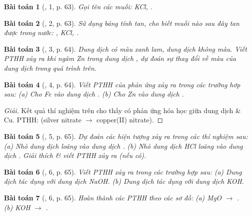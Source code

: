 \documentclass{article}
\newtheorem{baitoan}{Bài toán}
\begin{document}
\begin{baitoan}[\cite{SGK_KHTN_8_Canh_Dieu}, 1, p. 63]
	Gọi tên các muối: \emph{KCl, }.
\end{baitoan}

\begin{baitoan}[\cite{SGK_KHTN_8_Canh_Dieu}, 2, p. 63]
	Sử dụng bảng tính tan, cho biết muối nào sau đây tan được trong nước: \emph{, KCl, }.
\end{baitoan}

\begin{baitoan}[\cite{SGK_KHTN_8_Canh_Dieu}, 3, p. 64]
	Dung dịch \emph{} có màu xanh lam, dung dịch \emph{} không màu. Viết PTHH xảy ra khi ngâm \emph{Zn} trong dung dịch \emph{}, dự đoán sự thay đổi về màu của dung dịch trong quá trình trên.
\end{baitoan}

\begin{baitoan}[\cite{SGK_KHTN_8_Canh_Dieu}, 4, p. 64]
	Viết PTHH của phản ứng xảy ra trong các trường hơp sau: (a) Cho \emph{Fe} vào dung dịch \emph{}. (b) Cho \emph{Zn} vào dung dịch \emph{}.
\end{baitoan}

\begin{proof}[Giải]
	Kết quả thí nghiệm trên cho thấy có phản ứng hóa học giữa dung dịch  \& Cu. PTHH:  (silver nitrate $\to$ copper(II) nitrate).
\end{proof}

\begin{baitoan}[\cite{SGK_KHTN_8_Canh_Dieu}, 5, p. 65]
	Dự đoán các hiện tượng xảy ra trong các thí nghiệm sau: (a) Nhỏ dung dịch \emph{} loãng vào dung dịch \emph{}. (b) Nhỏ dung dịch \emph{HCl} loãng vào dung dịch \emph{}. Giải thích \& viết PTHH xảy ra (nếu có).
\end{baitoan}

\begin{baitoan}[\cite{SGK_KHTN_8_Canh_Dieu}, 6, p. 65]
	Viết PTHH xảy ra trong các trường hợp sau: (a) Dung dịch \emph{} tác dụng với dung dịch \emph{NaOH}. (b) Dung dịch \emph{} tác dụng với dung dịch \emph{KOH}.
\end{baitoan}

\begin{baitoan}[\cite{SGK_KHTN_8_Canh_Dieu}, 6, p. 65]
	Hoàn thành các PTHH theo các sơ đồ: (a) \emph{MgO $\to$ }. (b) \emph{KOH $\to$ }.
\end{baitoan}
\end{document}
